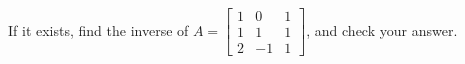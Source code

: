 If it exists, find the inverse of 
$A = \begin{bmatrix} 1 & 0 & 1 \\ 1 & 1 & 1 \\ 2 & -1 & 1\end{bmatrix}$, 
and check your answer.